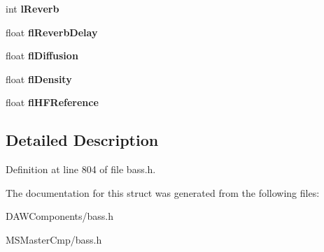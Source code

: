 \begin{DoxyCompactItemize}
\item 
\hypertarget{struct_b_a_s_s___d_x8___i3_d_l2_r_e_v_e_r_b_abb5ecb3324ef2baf89a705b7ea2e2b11_abb5ecb3324ef2baf89a705b7ea2e2b11}{int {\bfseries l\-Reverb}}\label{struct_b_a_s_s___d_x8___i3_d_l2_r_e_v_e_r_b_abb5ecb3324ef2baf89a705b7ea2e2b11_abb5ecb3324ef2baf89a705b7ea2e2b11}

\item 
\hypertarget{struct_b_a_s_s___d_x8___i3_d_l2_r_e_v_e_r_b_a6b4b4d42d466a042dcce95a9b6ffc75a_a6b4b4d42d466a042dcce95a9b6ffc75a}{float {\bfseries fl\-Reverb\-Delay}}\label{struct_b_a_s_s___d_x8___i3_d_l2_r_e_v_e_r_b_a6b4b4d42d466a042dcce95a9b6ffc75a_a6b4b4d42d466a042dcce95a9b6ffc75a}

\item 
\hypertarget{struct_b_a_s_s___d_x8___i3_d_l2_r_e_v_e_r_b_a68c326cead487bc08eb060ff0492029a_a68c326cead487bc08eb060ff0492029a}{float {\bfseries fl\-Diffusion}}\label{struct_b_a_s_s___d_x8___i3_d_l2_r_e_v_e_r_b_a68c326cead487bc08eb060ff0492029a_a68c326cead487bc08eb060ff0492029a}

\item 
\hypertarget{struct_b_a_s_s___d_x8___i3_d_l2_r_e_v_e_r_b_a74924c051e337eabbe439bea2e4cfb15_a74924c051e337eabbe439bea2e4cfb15}{float {\bfseries fl\-Density}}\label{struct_b_a_s_s___d_x8___i3_d_l2_r_e_v_e_r_b_a74924c051e337eabbe439bea2e4cfb15_a74924c051e337eabbe439bea2e4cfb15}

\item 
\hypertarget{struct_b_a_s_s___d_x8___i3_d_l2_r_e_v_e_r_b_a3074421854b36b937c7d4cb22606fc9d_a3074421854b36b937c7d4cb22606fc9d}{float {\bfseries fl\-H\-F\-Reference}}\label{struct_b_a_s_s___d_x8___i3_d_l2_r_e_v_e_r_b_a3074421854b36b937c7d4cb22606fc9d_a3074421854b36b937c7d4cb22606fc9d}

\end{DoxyCompactItemize}


\subsection{Detailed Description}


Definition at line 804 of file bass.\-h.



The documentation for this struct was generated from the following files\-:\begin{DoxyCompactItemize}
\item 
D\-A\-W\-Components/bass.\-h\item 
M\-S\-Master\-Cmp/bass.\-h\end{DoxyCompactItemize}

